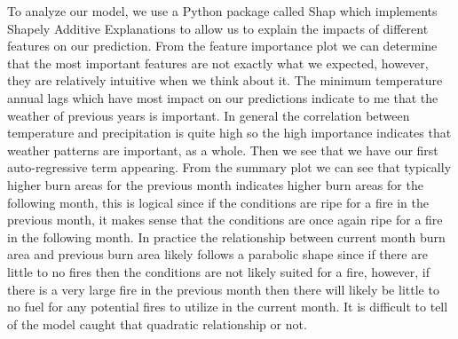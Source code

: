 \documentclass[12pt]{article}
\begin{document}
To analyze our model, we use a Python package called Shap which implements Shapely Additive Explanations to allow us to explain the impacts of different features on our prediction. From the feature importance plot we can determine that the most important features are not exactly what we expected, however, they are relatively intuitive when we think about it. The minimum temperature annual lags which have most impact on our predictions indicate to me that the weather of previous years is important. In general the correlation between temperature and precipitation is quite high so the high importance indicates that weather patterns are important, as a whole. Then we see that we have our first auto-regressive term appearing. From the summary plot we can see that typically higher burn areas for the previous month indicates higher burn areas for the following month, this is logical since if the conditions are ripe for a fire in the previous month, it makes sense that the conditions are once again ripe for a fire in the following month. In practice the relationship between current month burn area and previous burn area likely follows a parabolic shape since if there are little to no fires then the conditions are not likely suited for a fire, however, if there is a very large fire in the previous month then there will likely be little to no fuel for any potential fires to utilize in the current month. It is difficult to tell of the model caught that quadratic relationship or not. \\
\end{document}
